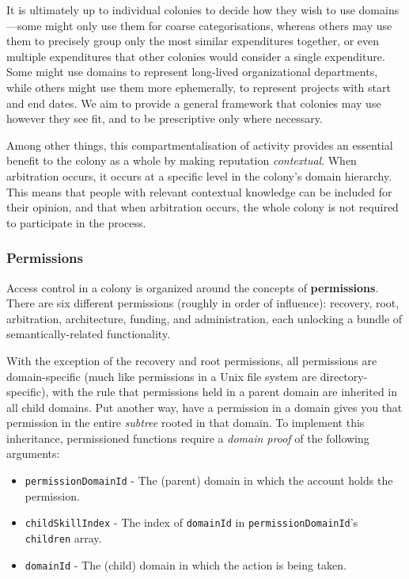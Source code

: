 It is ultimately up to individual colonies to decide how they wish to use domains—some might only use them for coarse categorisations, whereas others may use them to precisely group only the most similar expenditures together, or even multiple expenditures that other colonies would consider a single expenditure. Some might use domains to represent long-lived organizational departments, while others might use them more ephemerally, to represent projects with start and end dates. We aim to provide a general framework that colonies may use however they see fit, and to be prescriptive only where necessary.

Among other things, this compartmentalisation of activity provides an essential benefit to the colony as a whole by making reputation \textit{contextual}. When arbitration occurs, it occurs at a specific level in the colony's domain hierarchy. This means that people with relevant contextual knowledge can be included for their opinion, and that when arbitration occurs, the whole colony is not required to participate in the process.

\subsubsection{Permissions}

Access control in a colony is organized around the concepts of \textbf{permissions}. There are six different permissions (roughly in order of influence): recovery, root, arbitration, architecture, funding, and administration, each unlocking a bundle of semantically-related functionality.

With the exception of the recovery and root permissions, all permissions are domain-specific (much like permissions in a Unix file system are directory-specific), with the rule that permissions held in a parent domain are inherited in all child domains. Put another way, have a permission in a domain gives you that permission in the entire \textit{subtree} rooted in that domain. To implement this inheritance, permissioned functions require a \textit{domain proof} of the following arguments:

\begin{itemize}
\item \texttt{permissionDomainId} - The (parent) domain in which the account holds the permission.
\item \texttt{childSkillIndex} - The index of \texttt{domainId} in \texttt{permissionDomainId}'s \texttt{children} array.
\item \texttt{domainId} - The (child) domain in which the action is being taken.
\end{itemize}

